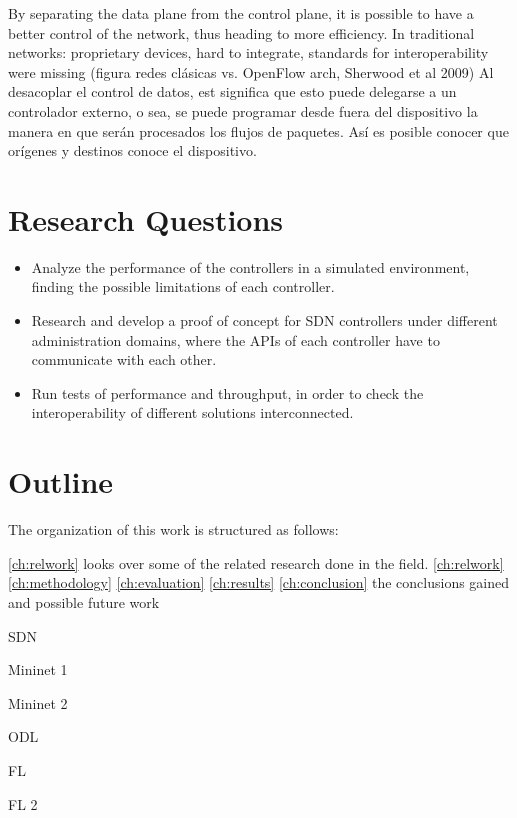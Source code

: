 By separating the data plane from the control plane, it is possible to have a better control of the network, thus heading to more efficiency.
In traditional networks: proprietary devices, hard to integrate, standards for interoperability were missing (figura redes clásicas vs. OpenFlow arch, Sherwood et al 2009)
Al desacoplar el control de datos, est significa que esto puede delegarse a un controlador externo, o sea, se puede programar desde fuera del dispositivo la manera en que serán procesados los flujos de paquetes.
Así es posible conocer que orígenes y destinos conoce el dispositivo.

\section{Research Questions}

\begin{itemize}
  \item Analyze the performance of the controllers in a simulated environment, finding the possible limitations of each controller.
  \item Research and develop a proof of concept for SDN controllers under different administration domains, where the APIs of each controller have to communicate with each other.
  \item Run tests of performance and throughput, in order to check the interoperability of different solutions interconnected.
\end{itemize}

\bigskip
\section{Outline}
The organization of this work is structured as follows:

\autoref{ch:relwork} looks over some of the related research done in the field.
\autoref{ch:relwork}
\autoref{ch:methodology}
\autoref{ch:evaluation}
\autoref{ch:results}
\autoref{ch:conclusion} the conclusions gained and possible future work

 \ac{SDN}


Mininet 1\cite{Mininet}

Mininet 2\cite{team2014mininet}

\cite{feamster2013road}

\cite{rowshanrad2016performance}

\cite{gomez2013openflow}

ODL \cite{odl}

FL \cite{fl}

FL 2 \cite{projectfloodlight}

